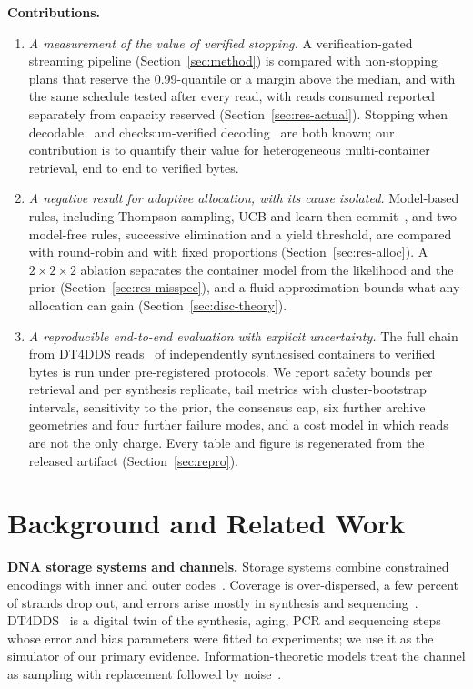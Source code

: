 \documentclass[conference,onecolumn,11pt]{IEEEtran}
\begin{document}
\textbf{Contributions.}
\begin{enumerate}
\item \emph{A measurement of the value of verified stopping.}  A verification-gated streaming pipeline
(Section~\ref{sec:method}) is compared with non-stopping plans that reserve the 0.99-quantile or a
margin above the median, and with the same schedule tested after every read, with reads consumed
reported separately from capacity reserved (Section~\ref{sec:res-actual}).  Stopping when
decodable~\cite{lopez2019dna} and checksum-verified decoding~\cite{erlich2017fountain} are both known;
our contribution is to quantify their value for heterogeneous multi-container retrieval, end to end to
verified bytes.
\item \emph{A negative result for adaptive allocation, with its cause isolated.}  Model-based rules,
including Thompson sampling, UCB and learn-then-commit~\cite{thompson1933likelihood,auer2002finite,garivier2016explore},
and two model-free rules, successive elimination and a yield threshold, are compared with round-robin and
with fixed proportions (Section~\ref{sec:res-alloc}).  A $2\times2\times2$ ablation separates the
container model from the likelihood and the prior (Section~\ref{sec:res-misspec}), and a fluid
approximation bounds what any allocation can gain (Section~\ref{sec:disc-theory}).
\item \emph{A reproducible end-to-end evaluation with explicit uncertainty.}  The full chain from
DT4DDS reads~\cite{gimpel2023digital} of independently synthesised containers to verified bytes is run
under pre-registered protocols.  We report safety bounds per retrieval and per synthesis replicate, tail
metrics with cluster-bootstrap intervals, sensitivity to the prior, the consensus cap, six further archive
geometries and four further failure modes, and a cost model in which reads are not the only charge.  Every
table and figure is regenerated from the released artifact (Section~\ref{sec:repro}).
\end{enumerate}

\section{Background and Related Work}\label{sec:related}
\textbf{DNA storage systems and channels.}  Storage systems combine constrained encodings with
inner and outer codes~\cite{antkowiak2020low,goldman2013towards,grass2015robust,erlich2017fountain,organick2018random,press2020hedges}.
Coverage is over-dispersed, a few percent of strands drop out, and errors arise mostly in
synthesis and sequencing~\cite{heckel2019characterization,chen2020quantifying,gimpel2023digital}.
DT4DDS~\cite{gimpel2023digital} is a digital twin of the synthesis, aging, PCR and sequencing
steps whose error and bias parameters were fitted to experiments; we use it as the simulator of
our primary evidence.  Information-theoretic models treat the channel as sampling with
replacement followed by noise~\cite{shomorony2021dna,weinberger2022dna,lenz2020coding}.
\end{document}
